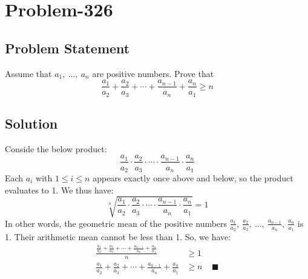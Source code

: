 \documentclass{article}
\begin{document}
\section*{Problem-326}
\subsection*{Problem Statement}
Assume that $a_1,\ \ldots,\ a_n$ are positive numbers. Prove that
\[
	\frac{a_1}{a_2} + \frac{a_2}{a_3} + \cdots + \frac{a_{n-1}}{a_n} + \frac{a_n}{a_1} \geq n
\]

\subsection*{Solution}
Conside the below product:
\[
	\frac{a_1}{a_2} \cdot \frac{a_2}{a_3} \cdot \cdots \cdot \frac{a_{n-1}}{a_n} \cdot \frac{a_n}{a_1}
\]
Each $a_i$ with $1 \leq i \leq n$ appears exactly once above and below, so the product evaluates to 1. We thus have:
\[
	\sqrt[n]{\frac{a_1}{a_2} \cdot \frac{a_2}{a_3} \cdot \cdots \cdot \frac{a_{n-1}}{a_n} \cdot \frac{a_n}{a_1}} = 1
\]
In other words, the geometric mean of the positive numbers $\frac{a_1}{a_2},\ \frac{a_2}{a_3},\ \ldots,\ \frac{a_{n-1}}{a_n},\ \frac{a_n}{a_1}$ is 1. Their arithmetic mean cannot be less than 1. So, we have:
\begin{equation*}
	\begin{aligned}
		\frac{\frac{a_1}{a_2} + \frac{a_2}{a_3} + \cdots + \frac{a_{n-1}}{a_n} + \frac{a_n}{a_1}}{n} &\geq 1\\
		\frac{a_1}{a_2} + \frac{a_2}{a_3} + \cdots + \frac{a_{n-1}}{a_n} + \frac{a_n}{a_1} &\geq n\ \ \ \ \ \blacksquare
	\end{aligned}
\end{equation*}
\end{document}
